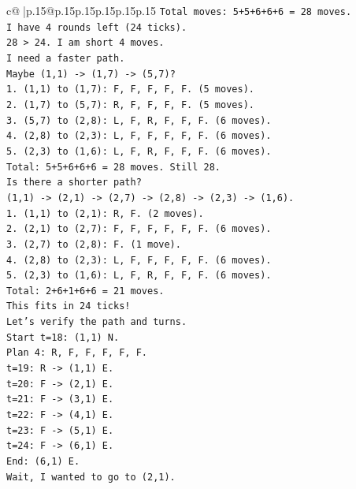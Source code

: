 \documentclass{article}
\begin{document}
{\begin{supertabular}{c@{$\;$}|p{.15\linewidth}@{}p{.15\linewidth}p{.15\linewidth}p{.15\linewidth}p{.15\linewidth}p{.15\linewidth}}
{{{\texttt{Total moves: 5+5+6+6+6 = 28 moves.} \\
\texttt{I have 4 rounds left (24 ticks).} \\
\texttt{28 > 24. I am short 4 moves.} \\
\texttt{I need a faster path.} \\
\texttt{Maybe (1,1) {-}> (1,7) {-}> (5,7)?} \\
\texttt{1. (1,1) to (1,7): F, F, F, F, F. (5 moves).} \\
\texttt{2. (1,7) to (5,7): R, F, F, F, F. (5 moves).} \\
\texttt{3. (5,7) to (2,8): L, F, R, F, F, F. (6 moves).} \\
\texttt{4. (2,8) to (2,3): L, F, F, F, F, F. (6 moves).} \\
\texttt{5. (2,3) to (1,6): L, F, R, F, F, F. (6 moves).} \\
\texttt{Total: 5+5+6+6+6 = 28 moves. Still 28.} \\
\texttt{Is there a shorter path?} \\
\texttt{(1,1) {-}> (2,1) {-}> (2,7) {-}> (2,8) {-}> (2,3) {-}> (1,6).} \\
\texttt{1. (1,1) to (2,1): R, F. (2 moves).} \\
\texttt{2. (2,1) to (2,7): F, F, F, F, F, F. (6 moves).} \\
\texttt{3. (2,7) to (2,8): F. (1 move).} \\
\texttt{4. (2,8) to (2,3): L, F, F, F, F, F. (6 moves).} \\
\texttt{5. (2,3) to (1,6): L, F, R, F, F, F. (6 moves).} \\
\texttt{Total: 2+6+1+6+6 = 21 moves.} \\
\texttt{This fits in 24 ticks!} \\
\texttt{Let's verify the path and turns.} \\
\texttt{Start t=18: (1,1) N.} \\
\texttt{Plan 4: R, F, F, F, F, F.} \\
\texttt{t=19: R {-}> (1,1) E.} \\
\texttt{t=20: F {-}> (2,1) E.} \\
\texttt{t=21: F {-}> (3,1) E.} \\
\texttt{t=22: F {-}> (4,1) E.} \\
\texttt{t=23: F {-}> (5,1) E.} \\
\texttt{t=24: F {-}> (6,1) E.} \\
\texttt{End: (6,1) E.} \\
\texttt{Wait, I wanted to go to (2,1).} \\
}}}
\end{supertabular}}
\end{document}

